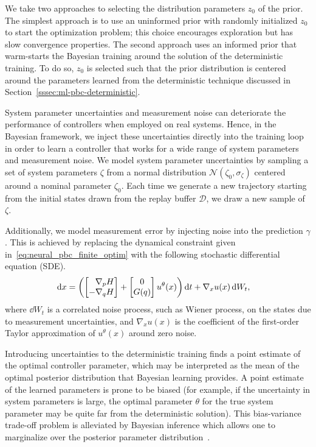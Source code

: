 We take two approaches to selecting the distribution parameters $z_0$ of the
prior. The simplest approach is to use an uninformed prior with randomly
initialized $z_0$ to start the optimization problem; this choice encourages
exploration but has slow convergence properties. The second approach uses an
informed prior that warm-starts the Bayesian training around the solution of the
deterministic training. To do so, $z_0$ is selected such that the prior
distribution is centered around the parameters learned from the deterministic
technique discussed in Section~\ref{sssec:ml-pbc-deterministic}.


System parameter uncertainties and measurement noise can deteriorate the
performance of controllers when employed on real systems. 
%
Hence, in the Bayesian framework, we inject these uncertainties directly into
the training loop in order to learn a controller that works for a wide range of
system parameters and measurement noise.
%
We model system parameter uncertainties by sampling a set of system parameters
$\zeta$ from a normal distribution $\mathcal{N}(\zeta_0, \sigma_{\zeta})$
centered around a nominal parameter $\zeta_0$.
%
Each time we generate a new trajectory starting from the initial states drawn
from the replay buffer $\mathcal{D}$, we draw a new sample of $\zeta$.
%


Additionally, we model measurement error by injecting noise into the prediction
$\gamma$.
%
This is achieved by replacing the dynamical constraint given
in~\eqref{eq:neural_pbc_finite_optim} with the following stochastic differential
equation (SDE).
\begin{align}
    \operatorname{d}\! x &= \left(\begin{bmatrix}\phantom{-}\nabla_p H \\-\nabla_q H\end{bmatrix} + \begin{bmatrix}0 \\ G(q)\end{bmatrix}u^{\theta}(x) \right) \operatorname{d}\! t + \nabla_x u(x) \operatorname{d}\! W_t, 
    \label{eq:sde_initial}
\end{align}
where $\dd W_t$ is a correlated noise process, such as Wiener process, on the
states due to measurement uncertainties, and $\nabla_x u(x)$ is the coefficient
of the first-order Taylor approximation of $u^{\theta}(x)$ around zero noise. 
  
\begin{rem}
    Introducing uncertainties to the deterministic training finds a point
    estimate of the optimal controller parameter, which may be interpreted
    as the mean of the optimal posterior distribution that Bayesian learning
    provides. A point estimate of the learned parameters is prone to be
    biased (for example, if the uncertainty in system parameters is large,
    the optimal parameter $\theta$ for the true system parameter may be
    quite far from the deterministic solution). This bias-variance trade-off
    problem is alleviated by Bayesian inference which allows one to
    marginalize over the posterior parameter
    distribution~\cite{bishop2006pattern}.
\end{rem}  


